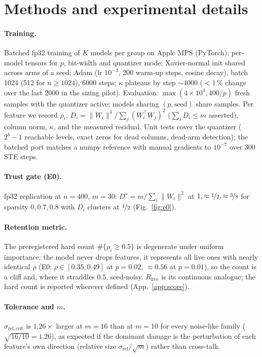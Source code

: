 \documentclass{article}
\begin{document}
\appendix
\section{Methods and experimental details}
\label{app:methods}
\paragraph{Training.} Batched fp32 training of $K$ models per group on Apple MPS (PyTorch); per-model tensors for $p$,
bit-width and quantizer mode; Xavier-normal init shared across arms of a seed; Adam (lr $10^{-3}$, 200 warm-up steps,
cosine decay), batch 1024 (512 for $n\ge1024$), 6000 steps; $\kappa$ plateaus by step $\sim$4000 ($<1\,\%$ change over the
last 2000 in the sizing pilot). Evaluation: $\max(4\times10^4, 400/p)$ fresh samples with the quantizer active; models sharing
$(p,\text{seed})$ share samples. Per feature we record $\rho_i$, $D_i = \lVert W_i\rVert^4/\sum_j(W_i^\top W_j)^2$
($\sum_iD_i\le m$ asserted), column norm, $\kappa$, and the measured residual. Unit tests cover the quantizer ($2^b-1$
reachable levels, exact zeros for dead columns, dead-arm detection); the batched port matches a numpy reference with
manual gradients to $10^{-7}$ over 300 STE steps.
\paragraph{Trust gate (E0).} fp32 replication at $n=400$, $m=30$: $D^\star = m/\sum_i\lVert W_i\rVert^2$ at $1,\approx\nicefrac12,\approx\nicefrac38$
for sparsity $0,0.7,0.8$ with $D_i$ clusters at $\nicefrac12$ (Fig.~\ref{fig:e0}).
\paragraph{Retention metric.} The preregistered hard count $\#\{\rho_i\ge0.5\}$ is degenerate under uniform importance:
the model never drops features, it represents all live ones with nearly identical $\rho$ (E0: $\rho\in[0.35,0.49]$ at
$p=0.02$, $\approx0.56$ at $p=0.01$), so the count is a cliff and, where it straddles $0.5$, seed-noisy. $R_{\mathrm{live}}$
is its continuous analogue; the hard count is reported wherever defined (App.~\ref{app:score}).
\paragraph{Tolerance and $m$.} $\sigma_{\mathrm{rel,crit}}$ is $1.26\times$ larger at $m=16$ than at $m=10$ for every
noise-like family ($\sqrt{16/10}=1.26$), as expected if the dominant damage is the perturbation of each feature's own
direction (relative size $\sigma_{\mathrm{rel}}/\sqrt m$) rather than cross-talk.
\end{document}
